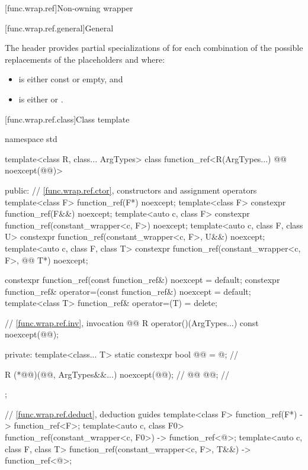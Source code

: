 [func.wrap.ref]{Non-owning wrapper}

[func.wrap.ref.general]{General}

\pnum
The header provides partial specializations of  for each combination of the possible replacements of the placeholders \cv{} and  where:
\begin{itemize}
\item \cv{} is either const or empty, and
\item {} is either  or .
\end{itemize}

[func.wrap.ref.class]{Class template }

\begin{codeblock}
namespace std {
  template<class R, class... ArgTypes>
  class function_ref<R(ArgTypes...) @\cv{}@ noexcept(@@)> {
  public:
    // \ref{func.wrap.ref.ctor}, constructors and assignment operators
    template<class F> function_ref(F*) noexcept;
    template<class F> constexpr function_ref(F&&) noexcept;
    template<auto c, class F> constexpr function_ref(constant_wrapper<c, F>) noexcept;
    template<auto c, class F, class U>
      constexpr function_ref(constant_wrapper<c, F>, U&&) noexcept;
    template<auto c, class F, class T>
      constexpr function_ref(constant_wrapper<c, F>, @\cv{}@ T*) noexcept;

    constexpr function_ref(const function_ref&) noexcept = default;
    constexpr function_ref& operator=(const function_ref&) noexcept = default;
    template<class T> function_ref& operator=(T) = delete;

    // \ref{func.wrap.ref.inv}, invocation
    @@ R operator()(ArgTypes...) const noexcept(@@);

  private:
    template<class... T>
      static constexpr bool @@ = @\seebelownc@;             // \expos

    R (*@@)(@@, ArgTypes&&...) noexcept(@@);      // \expos
    @@ @@;                                       // \expos
  };

  // \ref{func.wrap.ref.deduct}, deduction guides
  template<class F>
    function_ref(F*) -> function_ref<F>;
  template<auto c, class F0>
    function_ref(constant_wrapper<c, F0>) -> function_ref<@\seebelow@>;
  template<auto c, class F, class T>
    function_ref(constant_wrapper<c, F>, T&&) -> function_ref<@\seebelow@>;
}
\end{codeblock}

